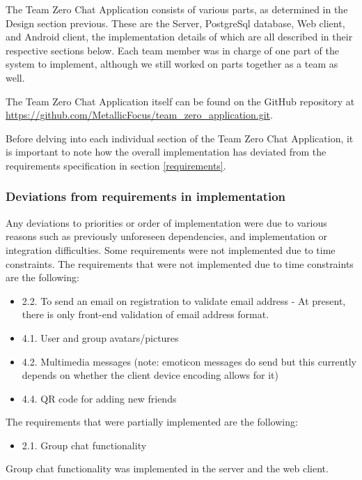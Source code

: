 The Team Zero Chat Application consists of various parts, as determined in the Design section previous. These are the Server, PostgreSql database, Web client, and Android client, the implementation details of which are all described in their respective sections below. Each team member was in charge of one part of the system to implement, although we still worked on parts together as a team as well.

The Team Zero Chat Application itself can be found on the GitHub repository at \\
\url{https://github.com/MetallicFocus/team_zero_application.git}.

Before delving into each individual section of the Team Zero Chat Application, it is important to note how the overall implementation has deviated from the requirements specification in section \ref{requirements}. 

\subsubsection{Deviations from requirements in implementation}
\label{deviations-from-requirements}

Any deviations to priorities or order of implementation were due to various reasons such as previously unforeseen dependencies, and implementation or integration difficulties. Some requirements were not implemented due to time constraints.
The requirements that were not implemented due to time constraints are the following:
\begin{itemize}
\item 2.2. To send an email on registration to validate email address - At present, there is only front-end validation of email address format.
\item 4.1. User and group avatars/pictures
\item 4.2. Multimedia messages (note: emoticon messages do send but this currently depends on whether the client device encoding allows for it)
\item 4.4. QR code for adding new friends 
\end{itemize}

The requirements that were partially implemented are the following:
\begin{itemize}
\item 2.1. Group chat functionality
\end{itemize}

Group chat functionality was implemented in the server and the web client. 

